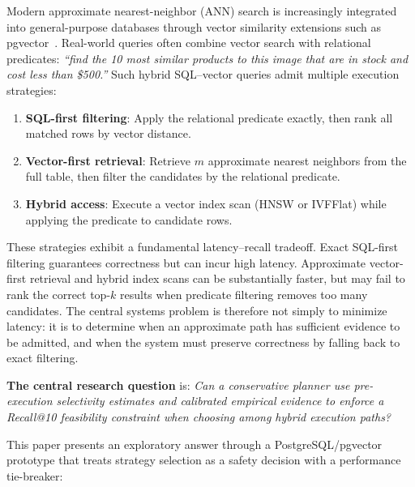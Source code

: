 \documentclass[10pt,twocolumn]{article}
\begin{document}
Modern approximate nearest-neighbor (ANN) search is increasingly integrated into general-purpose databases through vector similarity extensions such as pgvector~\cite{pgvector}. Real-world queries often combine vector search with relational predicates: \emph{``find the 10 most similar products to this image that are in stock and cost less than \$500.''} Such hybrid SQL--vector queries admit multiple execution strategies:

\begin{enumerate}
\item \textbf{SQL-first filtering}: Apply the relational predicate exactly, then rank all matched rows by vector distance.
\item \textbf{Vector-first retrieval}: Retrieve $m$ approximate nearest neighbors from the full table, then filter the candidates by the relational predicate.
\item \textbf{Hybrid access}: Execute a vector index scan (HNSW or IVFFlat) while applying the predicate to candidate rows.
\end{enumerate}

These strategies exhibit a fundamental latency--recall tradeoff. Exact SQL-first filtering guarantees correctness but can incur high latency. Approximate vector-first retrieval and hybrid index scans can be substantially faster, but may fail to rank the correct top-$k$ results when predicate filtering removes too many candidates. The central systems problem is therefore not simply to minimize latency: it is to determine when an approximate path has sufficient evidence to be admitted, and when the system must preserve correctness by falling back to exact filtering.

\textbf{The central research question} is: \emph{Can a conservative planner use pre-execution selectivity estimates and calibrated empirical evidence to enforce a Recall@10 feasibility constraint when choosing among hybrid execution paths?}

This paper presents an exploratory answer through a PostgreSQL/pgvector prototype that treats strategy selection as a safety decision with a performance tie-breaker:
\end{document}

